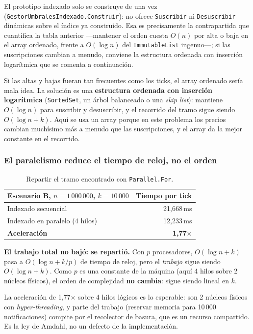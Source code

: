 El prototipo indexado solo se construye de una vez
(\texttt{GestorUmbralesIndexado.Construir}): no ofrece \texttt{Suscribir} ni
\texttt{Desuscribir} dinámicas sobre el índice ya construido. Esa es precisamente
la contrapartida que cuantifica la tabla anterior ---mantener el orden cuesta
$O(n)$ por alta o baja en el array ordenado, frente a $O(\log n)$ del
\texttt{ImmutableList} ingenuo---; si las suscripciones cambian a menudo, conviene
la estructura ordenada con inserción logarítmica que se comenta a continuación.

Si las altas y bajas fueran tan frecuentes como los ticks, el array ordenado sería mala idea.
La solución es una \textbf{estructura ordenada con inserción logarítmica}
(\texttt{SortedSet}, un árbol balanceado o una \emph{skip list}): mantiene $O(\log n)$ para
suscribir y desuscribir, y el recorrido del tramo sigue siendo $O(\log n + k)$. Aquí se usa
un array porque en este problema los precios cambian muchísimo más a menudo que las
suscripciones, y el array da la mejor constante en el recorrido.

\subsubsection{El paralelismo reduce el tiempo de reloj, no el orden}

\begin{table}[H]
\centering
\small
\begin{tabular}{lr}
\toprule
\textbf{Escenario B, $n = 1\,000\,000$, $k = 10\,000$} & \textbf{Tiempo por tick} \\
\midrule
Indexado secuencial & 21,668\,ms \\
Indexado en paralelo (4 hilos) & 12,233\,ms \\
\textbf{Aceleración} & \textbf{1,77$\times$} \\
\bottomrule
\end{tabular}
\caption{Repartir el tramo encontrado con \texttt{Parallel.For}.}
\end{table}

\textbf{El trabajo total no bajó: se repartió.} Con $p$ procesadores, $O(\log n + k)$ pasa a
$O(\log n + k/p)$ de tiempo de reloj, pero el \emph{trabajo} sigue siendo $O(\log n + k)$.
Como $p$ es una constante de la máquina (aquí 4 hilos sobre 2 núcleos físicos), el orden de
complejidad \textbf{no cambia}: sigue siendo lineal en $k$.

La aceleración de 1,77$\times$ sobre 4 hilos lógicos es lo esperable: son 2 núcleos físicos
con \emph{hyper-threading}, y parte del trabajo (reservar memoria para 10\,000
notificaciones) compite por el recolector de basura, que es un recurso compartido. Es la ley
de Amdahl, no un defecto de la implementación.

